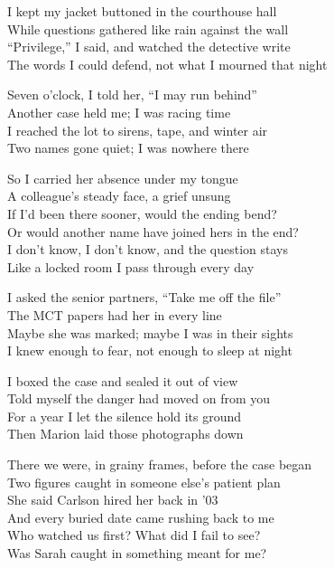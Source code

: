 \begin{lyrics}
I kept my jacket buttoned in the courthouse hall\\
While questions gathered like rain against the wall\\
“Privilege,” I said, and watched the detective write\\
The words I could defend, not what I mourned that night

Seven o’clock, I told her, “I may run behind”\\
Another case held me; I was racing time\\
I reached the lot to sirens, tape, and winter air\\
Two names gone quiet; I was nowhere there

So I carried her absence under my tongue\\
A colleague’s steady face, a grief unsung\\
If I’d been there sooner, would the ending bend?\\
Or would another name have joined hers in the end?\\
I don’t know, I don’t know, and the question stays\\
Like a locked room I pass through every day

I asked the senior partners, “Take me off the file”\\
The MCT papers had her in every line\\
Maybe she was marked; maybe I was in their sights\\
I knew enough to fear, not enough to sleep at night

I boxed the case and sealed it out of view\\
Told myself the danger had moved on from you\\
For a year I let the silence hold its ground\\
Then Marion laid those photographs down

There we were, in grainy frames, before the case began\\
Two figures caught in someone else’s patient plan\\
She said Carlson hired her back in ’03\\
And every buried date came rushing back to me\\
Who watched us first? What did I fail to see?\\
Was Sarah caught in something meant for me?


\end{lyrics}
